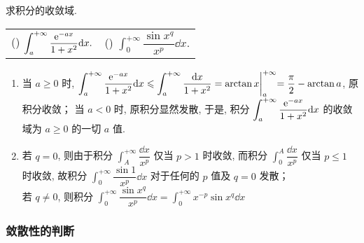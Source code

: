 \begin{example}
    求积分的收敛域.
    \setcounter{magicrownumbers}{0}
    \begin{table}[H]
        \centering
        \begin{tabular}{l | l}
            (\rownumber{}) $\displaystyle\int_{a}^{+\infty}\dfrac{\mathrm{e} ^{-ax}}{1+x^2}\dd x.$ & (\rownumber{}) $\displaystyle\int_{0}^{+\infty}\dfrac{\sin x^q}{x^p}\dd x.$
        \end{tabular}
    \end{table}
\end{example}
\begin{solution}
    \begin{enumerate}[label=(\arabic{*})]
        \item 当 $a\geqslant 0$ 时, $\displaystyle \int_{a}^{+\infty}\dfrac{\mathrm{e} ^{-ax}}{1+x^2}\dd x\leqslant \int_{a}^{+\infty}\dfrac{\dd x}{1+x^2}=\arctan x\biggl |_a^{+\infty}=\dfrac{\pi}{2}-\arctan a$, 原积分收敛；
              当 $a<0$ 时, 原积分显然发散, 于是, 积分 $\displaystyle\int_{a}^{+\infty}\dfrac{\mathrm{e} ^{-ax}}{1+x^2}\dd x$ 的收敛域为 $a\geqslant 0$ 的一切 $a$ 值.
        \item 若 $q=0$, 则由于积分 $\displaystyle\int_{A}^{+\infty}\dfrac{\dd x}{x^p}$ 仅当 $p>1$ 时收敛, 而积分 $\displaystyle\int_{0}^{A}\dfrac{\dd x}{x^p}$ 仅当 $p\leqslant1$ 时收敛, 故积分
              $\displaystyle\int_{0}^{+\infty}\dfrac{\sin 1}{x^p}\dd x$ 对于任何的 $p$ 值及 $q=0$ 发散；\\
              若 $q\neq 0$, 则积分 $\displaystyle\int_{0}^{+\infty}\dfrac{\sin x^q}{x^p}\dd x=\int_{0}^{+\infty}x^{-p}\sin x^q\dd x$
    \end{enumerate}
\end{solution}

\subsubsection{敛散性的判断}

